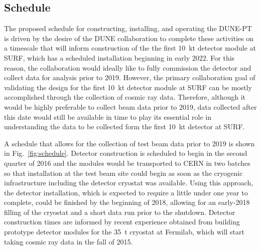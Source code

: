 


\subsection{Schedule}

The proposed schedule for constructing, installing, and operating the DUNE-PT is driven by the desire of the DUNE collaboration to 
complete these activities on a timescale that will inform construction of the the first 10~kt detector module at SURF, which has 
a scheduled installation beginning in early 2022.  For this reason, the collaboration would ideally like to fully commission the 
detector and collect data for analysis prior to 2019.  However, the primary collaboration goal of validating the design for the 
first 10~kt detector module at SURF can be mostly accomplished through the collection of cosmic ray data.  Therefore, although 
it would be highly preferable to collect beam data prior to 2019, data collected after this date would still be available in time 
to play its essential role in understanding the data to be collected form the first 10~kt detector at SURF.   

A schedule that allows for the collection of test beam data prior to 2019 is shown in Fig.~\ref{fig:schedule}.  Detector construction 
is scheduled to begin in the second quarter of 2016 and the modules would be transported to CERN in two batches so that installation 
at the test beam site could begin as soon as the cryogenic infrastructure including the detector cryostat was available.  Using 
this approach, the detector installation, which is expected to require a little under one year to complete, could be finished by 
the beginning of 2018, allowing for an early-2018 filling of the cryostat and a short data run prior to the shutdown.  Detector 
construction times are informed by recent experience obtained from building prototype detector modules for the 35~t cryostat at 
Fermilab, which will start taking cosmic ray data in the fall of 2015.          

